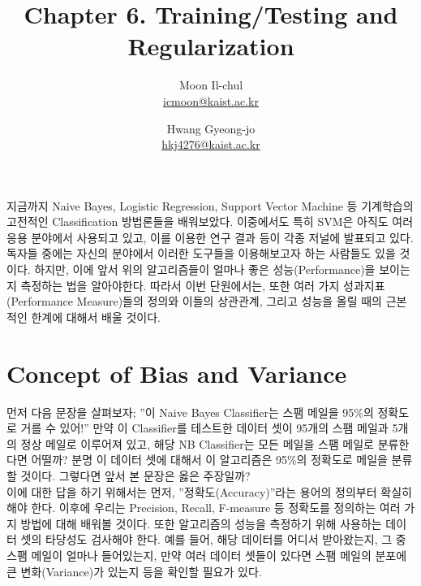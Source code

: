 \documentclass[a4paper]{oblivoir}
\author{Moon Il-chul \\ \href{mailto:icmoon@kaist.ac.kr}{icmoon@kaist.ac.kr} 
   \and Hwang Gyeong-jo
 \\ \href{mailto:hkj4276@kaist.ac.kr}{hkj4276@kaist.ac.kr} }
\title{Chapter 6. Training/Testing and Regularization}
\begin{document}
\maketitle
\tableofcontents

\section*{}
지금까지 Naive Bayes, Logistic Regression, Support Vector Machine 등 기계학습의 고전적인 Classification 방법론들을 배워보았다. 이중에서도 특히 SVM은 아직도 여러 응용 분야에서 사용되고 있고, 이를 이용한 연구 결과 등이 각종 저널에 발표되고 있다. 독자들 중에는 자신의 분야에서 이러한 도구들을 이용해보고자 하는 사람들도 있을 것이다. 하지만, 이에 앞서 위의 알고리즘들이 얼마나 좋은 성능(Performance)을 보이는지 측정하는 법을 알아야한다. 따라서 이번 단원에서는, 또한 여러 가지 성과지표(Performance Measure)들의 정의와 이들의 상관관계, 그리고 성능을 올릴 때의 근본적인 한계에 대해서 배울 것이다.

\section{Concept of Bias and Variance}

먼저 다음 문장을 살펴보자; ''이 Naive Bayes Classifier는 스팸 메일을 95\%의 정확도로 거를 수 있어!'' 만약 이 Classifier를 테스트한 데이터 셋이 95개의 스팸 메일과 5개의 정상 메일로 이루어져 있고, 해당 NB Classifier는 모든 메일을 스팸 메일로 분류한다면 어떨까? 분명 이 데이터 셋에 대해서 이 알고리즘은 95\%의 정확도로 메일을 분류할 것이다. 그렇다면 앞서 본 문장은 옳은 주장일까?  \\
\indent 이에 대한 답을 하기 위해서는 먼저, ''정확도(Accuracy)''라는 용어의 정의부터 확실히 해야 한다. 이후에 우리는 Precision, Recall, F-measure 등 정확도를 정의하는 여러 가지 방법에 대해 배워볼 것이다. 또한 알고리즘의 성능을 측정하기 위해 사용하는 데이터 셋의 타당성도 검사해야 한다. 예를 들어, 해당 데이터를 어디서 받아왔는지, 그 중 스팸 메일이 얼마나 들어있는지, 만약 여러 데이터 셋들이 있다면 스팸 메일의 분포에 큰 변화(Variance)가 있는지 등을 확인할 필요가 있다.

\end{document}
